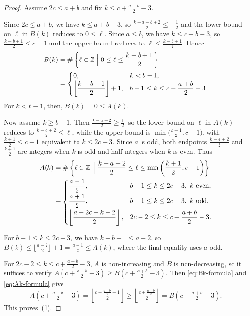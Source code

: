 \documentclass[10pt,a4paper]{amsart}
\def\Z{\mathbb{Z}}
\begin{document}
\begin{proof}
Assume $2c \leq a+b$ and fix $k \leq c + \tfrac{a+b}{2} - 3$.
 
Since $2c \leq a+b$, we have $k \leq a+b-3$, so $\tfrac{k-a-b+2}{2} \leq -\tfrac{1}{2}$ and the lower bound on $\ell$ in $B(k)$ reduces to $0 \leq \ell$. Since $a \leq b$, we have $k \leq c + b - 3$, so $\tfrac{k-b+1}{2} \leq c - 1$ and the upper bound reduces to $\ell \leq \tfrac{k-b+1}{2}$. Hence
\begin{align}
    B(k)&=\# \left \{ \ell \in \Z \Bigm| 0 \le \ell \le \frac{k - b + 1}{2}\right \} \nonumber\\
    &=\begin{cases} 0, & k < b-1, \\ \left\lfloor \dfrac{k-b+1}{2} \right\rfloor + 1, & b-1 \leq k \leq c + \dfrac{a+b}{2} - 3. \label{eq:Bk-formula} \end{cases}
\end{align}
For $k < b-1$, then, $B(k) = 0 \leq A(k)$.
 
Now assume $k \geq b-1$. Then $\tfrac{k-a+2}{2} \geq \tfrac{1}{2}$, so the lower bound on $\ell$ in $A(k)$ reduces to $\tfrac{k-a+2}{2} \leq \ell$, while the upper bound is $\min\bigl(\tfrac{k+1}{2}, c-1\bigr)$, with $\tfrac{k+1}{2} \leq c-1$ equivalent to $k \leq 2c-3$. Since $a$ is odd, both endpoints $\tfrac{k-a+2}{2}$ and $\tfrac{k+1}{2}$ are integers when $k$ is odd and half-integers when $k$ is even. Thus
\begin{align}
A(k) &= \# \left \{ \ell \in \Z \, \Bigm|  \frac{k - a + 2}{2} \le \ell  \le \min \left(\frac{k + 1}{2},c-1\right) \right \} \nonumber \\
&= \begin{cases} 
    \dfrac{a-1}{2}, & b-1 \leq k \leq 2c-3,\ k \text{ even}, \\[5pt] 
    \dfrac{a+1}{2}, & b-1 \leq k \leq 2c-3,\ k \text{ odd}, \\[5pt]
    \left\lfloor \dfrac{a+2c-k-2}{2} \right\rfloor, & 2c-2 \leq k \leq c + \dfrac{a+b}{2} - 3. \label{eq:Ak-formula} 
\end{cases}
\end{align}
 
For $b-1 \leq k \leq 2c-3$, we have $k - b + 1 \leq a - 2$, so $B(k) \leq \lfloor \tfrac{a-2}{2} \rfloor + 1 = \tfrac{a-1}{2} \leq A(k)$, where the final equality uses $a$ odd.
 
For $2c-2 \leq k \leq c + \tfrac{a+b}{2} - 3$, $A$ is non-increasing and $B$ is non-decreasing, so it suffices to verify $A(c + \tfrac{a+b}{2} - 3) \geq B(c + \tfrac{a+b}{2} - 3)$. Then \eqref{eq:Bk-formula} and \eqref{eq:Ak-formula} give
\[
    A(c + \tfrac{a+b}{2} - 3) = \left\lfloor \tfrac{c + \tfrac{a-b}{2}+1}{2} \right\rfloor \geq \left\lfloor \tfrac{c + \tfrac{a-b}{2}}{2} \right\rfloor = B(c + \tfrac{a+b}{2} - 3).
\]
This proves~(1).


\end{proof}
\end{document}
